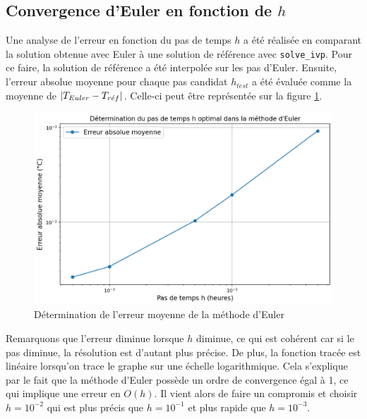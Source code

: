 \documentclass[12pt]{article}
\begin{document}
    \subsection{Convergence d'Euler en fonction de $h$}
        Une analyse de l'erreur en fonction du pas de temps $h$ a été réalisée en comparant la solution obtenue avec Euler à une solution de référence avec \texttt{solve\_ivp}. Pour ce faire, la solution de référence a été interpolée sur les pas d'Euler. Ensuite, l'erreur absolue moyenne pour chaque pas candidat $h_{test}$ a été évaluée comme la moyenne de $\left|T_{Euler}-T_{r\Acute{e}f}\right|$. Celle-ci peut être représentée sur la figure \ref{fig:Optimal}.
        \begin{figure}
            \centering
            \includegraphics[width=0.96\linewidth]{Rapport/figures/PasEulerOptimal.png}
            \caption{Détermination de l'erreur moyenne de la méthode d'Euler}
            \label{fig:Optimal}
        \end{figure}
        Remarquons que l'erreur diminue lorsque $h$ diminue, ce qui est cohérent car si le pas diminue, la résolution est d'autant plus précise. De plus, la fonction tracée est linéaire lorsqu'on trace le graphe sur une échelle logarithmique. Cela s'explique par le fait que la méthode d'Euler possède un ordre de convergence égal à 1, ce qui implique une erreur en $O(h)$. Il vient alors de faire un compromis et choisir $h=10^{-2}$ qui est plus précis que $h=10^{-1}$ et plus rapide que $h=10^{-3}$.
\end{document}
